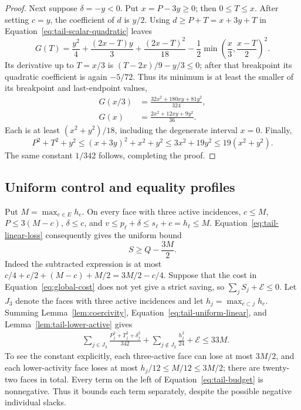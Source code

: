 \begin{proof}
Next suppose $\delta=-y<0$.  Put $x=P-3y\ge0$; then $0\le T\le x$.
After setting $c=y$, the coefficient of $d$ is $y/2$.
Using $d\ge P+T=x+3y+T$ in
Equation~\eqref{eq:tail-scalar-quadratic} leaves
\[
 G(T)=\frac{y^2}{4}+\frac{(2x-T)y}{3}
 +\frac{(2x-T)^2}{18}
 -\frac12\min\left(\frac x3,\frac{x-T}{2}\right)^2.
\]
Its derivative up to $T=x/3$ is $(T-2x)/9-y/3\le0$; after that
breakpoint its quadratic coefficient is again $-5/72$.  Thus its
minimum is at least the smaller of its breakpoint and last-endpoint values,
\begin{align*}
 G(x/3)&=\frac{32x^2+180xy+81y^2}{324},\\
 G(x)&=\frac{2x^2+12xy+9y^2}{36}.
\end{align*}
Each is at least $(x^2+y^2)/18$, including the degenerate interval
$x=0$.  Finally,
\[
 P^2+T^2+y^2\le(x+3y)^2+x^2+y^2
                 \le3x^2+19y^2\le19(x^2+y^2).
\]
The same constant $1/342$ follows, completing the proof.
\end{proof}

\subsection{Uniform control and equality profiles}

Put $M=\max_{e\in E}h_e$.  On every face with three active incidences,
$c\le M$, $P\le3(M-c)$, $\delta\le c$, and
$v\le p_\ell+\delta\le s_\ell+c=h_\ell\le M$.
Equation~\eqref{eq:tail-linear-loss} consequently gives the uniform bound
\begin{equation}\label{eq:tail-uniform-linear}
 S\ge Q-\frac{3M}{2}.
\end{equation}
Indeed the subtracted expression is at most
$c/4+c/2+(M-c)+M/2=3M/2-c/4$.
Suppose that the cost in Equation~\eqref{eq:global-cost} does not yet
give a strict saving, so $\sum_jS_j+\mathcal E\le0$.
Let $J_3$ denote the faces with three active incidences and let
$h_j=\max_{e\subset j}h_e$.  Summing
Lemma~\ref{lem:coercivity}, Equation~\eqref{eq:tail-uniform-linear},
and Lemma~\ref{lem:tail-lower-active} gives
\begin{equation}\label{eq:tail-budget}
 \begin{split}
 &\sum_{j\in J_3}
 \frac{P_j^2+T_j^2+\delta_j^2}{342}
 +\sum_{j\notin J_3}\frac{h_j^2}{24}+\mathcal E
 \le33M.
 \end{split}
\end{equation}
To see the constant explicitly, each three-active face can lose at
most $3M/2$, and each lower-activity face loses at
most $h_j/12\le M/12\le3M/2$; there are twenty-two faces in total.
Every term on the left of
Equation~\eqref{eq:tail-budget} is nonnegative.  Thus it bounds each
term separately, despite the possible negative individual slacks.

